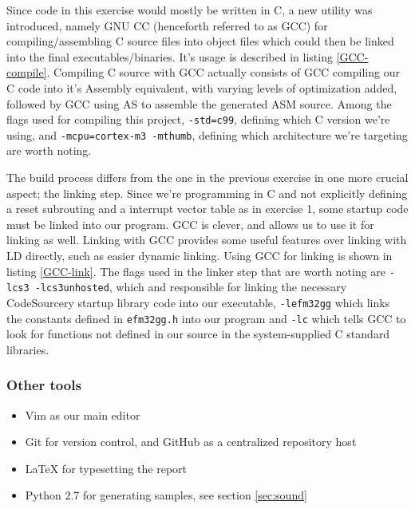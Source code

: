Since code in this exercise would mostly be written in C, a new utility was introduced, namely GNU CC (henceforth referred to as GCC) for compiling/assembling C source files into object files which could then be linked into the final executables/binaries. It's usage is described in listing \ref{GCC-compile}. Compiling C source with GCC actually consists of GCC compiling our C code into it's Assembly equivalent, with varying levels of optimization added, followed by GCC using AS to assemble the generated ASM source. Among the flags used for compiling this project, \texttt{-std=c99}, defining which C version we're using, and \texttt{-mcpu=cortex-m3 -mthumb}, defining which architecture we're targeting are worth noting.

The build process differs from the one in the previous exercise in one more crucial aspect; the linking step. Since we're programming in C and not explicitly defining a reset subrouting and a interrupt vector table as in exercise 1, some startup code must be linked into our program. GCC is clever, and allows us to use it for linking as well. Linking with GCC provides some useful features over linking with LD directly, such as easier dynamic linking. Using GCC for linking is shown in listing \ref{GCC-link}. The flags used in the linker step that are worth noting are \texttt{-lcs3 -lcs3unhosted}, which and responsible for linking the necessary CodeSourcery startup library code into our executable, \texttt{-lefm32gg} which links the constants defined in \texttt{efm32gg.h} into our program and \texttt{-lc} which tells GCC to look for functions not defined in our source in the system-supplied C standard libraries.


\subsubsection{Other tools}

\begin{itemize}
\label{other-tools}
\item Vim as our main editor
\item Git for version control, and GitHub as a centralized repository host
\item \LaTeX{} for typesetting the report
\item Python 2.7 for generating samples, see section \ref{sec:sound}
\end{itemize}
